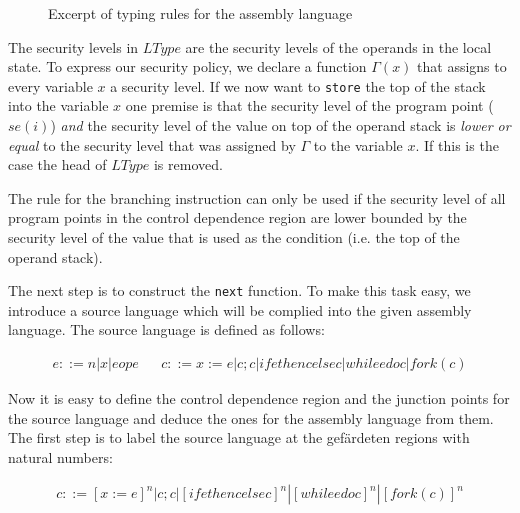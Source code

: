 \documentclass[a4paper,10pt]{llncs}
\begin{document}
\begin{figure}
\begin{prooftree}
\end{prooftree}

\begin{prooftree}
\end{prooftree}
\caption{Excerpt of typing rules for the assembly language}
\label{fig:transfer-rules}
\end{figure}

The security levels in $LType$ are the security levels of the operands in the local state. To
express our security policy, we declare a function $\Gamma(x)$ that assigns to every variable
$x$ a security level. If we now want to \texttt{store} the top of the stack into the variable
$x$ one premise is that the security level of the program point ($se(i)$) \textit{and} the
security level of the value on top of the operand stack is \textit{lower or equal} to the
security level that was assigned by $\Gamma$ to the variable $x$. If this is the case the head
of $LType$ is removed.

The rule for the branching instruction can only be used if the security level of all program
points in the control dependence region are lower bounded by the security level of the value
that is used as the condition (i.e. the top of the operand stack). 

The next step is to construct the \texttt{next} function. To make this task easy, we introduce
a source language which will be complied into the given assembly language. The source language
is defined as follows:

\begin{align*}
e ::= n | x | e op e && c ::= x := e | c;c | if e then c else c | while e do c | fork(c)
\end{align*}

Now it is easy to define the control dependence region and the junction points for the source
language and deduce the ones for the assembly language from them. The first step is to label the
source language at the gefärdeten regions with natural numbers:

\begin{align*}
c ::= [x := e]^n | c;c | [if e then c else c]^n | [while e do c]^n | [fork(c)]^n
\end{align*}
\end{document}
